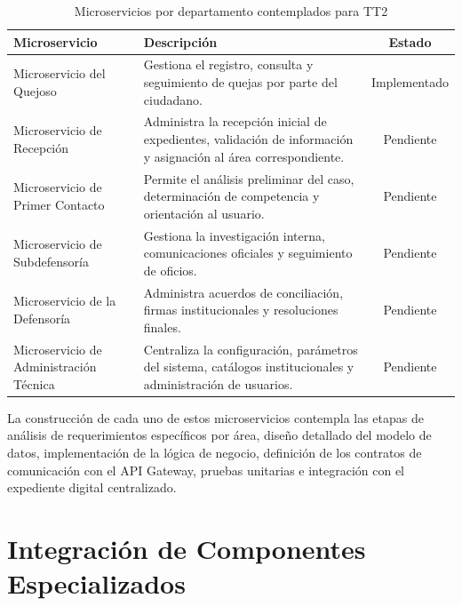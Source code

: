 \begin{table}[H]
\centering
\caption{Microservicios por departamento contemplados para TT2}
\label{tab:microservicios_tt2}
\renewcommand{\arraystretch}{1.4}
\begin{tabularx}{\textwidth}{|p{5cm}|X|c|}
\hline
\textbf{Microservicio} & \textbf{Descripción} & \textbf{Estado} \\
\hline

Microservicio del Quejoso &
Gestiona el registro, consulta y seguimiento de quejas por parte del ciudadano. &
Implementado \\
\hline

Microservicio de Recepción &
Administra la recepción inicial de expedientes, validación de información y asignación al área correspondiente. &
Pendiente \\
\hline

Microservicio de Primer Contacto &
Permite el análisis preliminar del caso, determinación de competencia y orientación al usuario. &
Pendiente \\
\hline

Microservicio de Subdefensoría &
Gestiona la investigación interna, comunicaciones oficiales y seguimiento de oficios. &
Pendiente \\
\hline

Microservicio de la Defensoría &
Administra acuerdos de conciliación, firmas institucionales y resoluciones finales. &
Pendiente \\
\hline

Microservicio de Administración Técnica &
Centraliza la configuración, parámetros del sistema, catálogos institucionales y administración de usuarios. &
Pendiente \\
\hline

\end{tabularx}
\end{table}

La construcción de cada uno de estos microservicios contempla las etapas de análisis de requerimientos específicos por área, diseño detallado del modelo de datos, implementación de la lógica de negocio, definición de los contratos de comunicación con el API Gateway, pruebas unitarias e integración con el expediente digital centralizado.

\section{Integración de Componentes Especializados}


